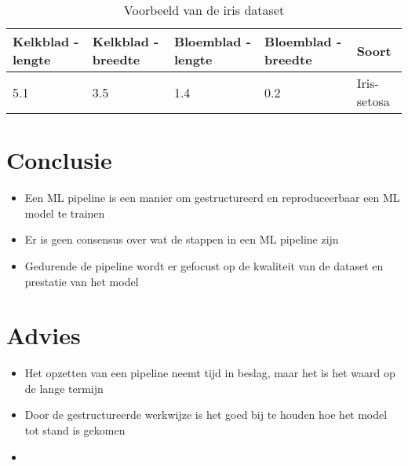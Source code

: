 \begin{table}[hbt!]
  \footnotesize
  \centering
  \begin{tabular}{|l|l|l|l|l|}
  \hline
  \textbf{Kelkblad - lengte} & \textbf{Kelkblad - breedte} & \textbf{Bloemblad - lengte} & \textbf{Bloemblad - breedte} & \textbf{Soort} \\ \hline
  5.1 & 3.5 & 1.4 & 0.2 & Iris-setosa\\ \hline
  \end{tabular}
  \caption{Voorbeeld van de iris dataset}
  \label{table:example-iris-dataset}
\end{table}

\section{Conclusie}\label{conclusie}
\begin{itemize}
  \item Een ML pipeline is een manier om gestructureerd en reproduceerbaar een ML model te trainen
  \item Er is geen consensus over wat de stappen in een ML pipeline zijn
  \item Gedurende de pipeline wordt er gefocust op de kwaliteit van de dataset en prestatie van het model
\end{itemize}

\section{Advies}\label{advies}
\begin{itemize}
  \item Het opzetten van een pipeline neemt tijd in beslag, maar het is het waard op de lange termijn
  \item Door de gestructureerde werkwijze is het goed bij te houden hoe het model tot stand is gekomen
  \item 
\end{itemize}



